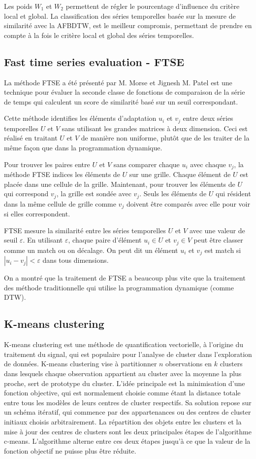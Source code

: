Les poids $W_1$ et $W_2$ permettent de régler le pourcentage d’influence du critère local et global. La classification des séries temporelles basée sur la mesure de similarité avec la AFBDTW, est le meilleur compromis, permettant de prendre en compte à la fois le critère local et global des séries temporelles.
\subsection{Fast time series evaluation - FTSE}
La méthode FTSE a été présenté par M. Morse et Jignesh M. Patel \cite{morse2007} est une technique pour évaluer la seconde classe de fonctions de comparaison de la série de temps qui calculent un score de similarité basé sur un seuil correspondant.

Cette méthode identifies les éléments d’adaptation $u_i$ et $v_j$ entre deux séries temporelles $U$ et $V$ sans utilisant les grandes matrices à deux dimension. Ceci est réalisé en traitant $U$ et $V$ de manière non uniforme, plutôt que de les traiter de la même façon que dans la programmation dynamique.

Pour trouver les paires entre $U$ et $V$ sans comparer chaque $u_i$ avec chaque $v_j$, la méthode FTSE indices les éléments de $U$ sur une grille. Chaque élément de $U$ est placée dans une cellule de la grille. Maintenant, pour trouver les éléments de $U$ qui correspond $v_j$, la grille est sondée avec $v_j$. Seuls les éléments de $U$ qui résident dans la même cellule de
grille comme $v_j$ doivent être comparés avec elle pour voir si elles correspondent.

FTSE mesure la similarité entre les séries temporelles $U$ et $V$ avec une valeur de seuil $\varepsilon$. En utilisant $\varepsilon$, chaque paire d'élément $u_i \in U$ et $v_j \in V$ peut être classer comme un match ou on décalage. On peut dit un élément $u_i$ et $v_j$ est match si $| u_i - v_j | <  \varepsilon$ dans tous dimensions.

On a montré que la traitement de FTSE a beaucoup plus vite que la traitement des méthode traditionnelle qui utilise la programmation dynamique (comme DTW).
\subsection{K-means clustering}
K-means clustering est une méthode de quantification vectorielle, à l'origine du traitement du signal, qui est populaire pour l'analyse de cluster dans l'exploration de données. K-means clustering vise à partitionner $n$ observations en $k$ clusters dans lesquels chaque observation appartient au cluster avec la moyenne la plus proche, sert de prototype du cluster. L'idée principale est la minimisation d'une fonction objective, qui est normalement choisie comme étant la distance totale entre tous les modèles de leurs centres de cluster respectifs. Sa solution repose sur un schéma itératif, qui commence par des appartenances ou des centres de cluster initiaux choisis arbitrairement. La répartition des objets entre les clusters et la mise à jour des centres de clusters sont les deux principales étapes de l'algorithme c-means. L'algorithme alterne entre ces deux étapes jusqu'à ce que la valeur de la fonction objectif ne puisse plus être réduite.

